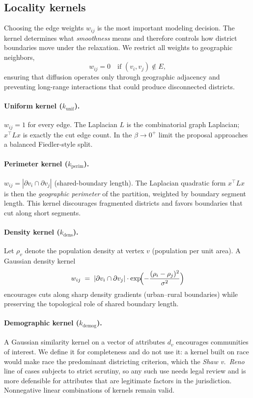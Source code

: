 \documentclass[11pt]{article}
\begin{document}
\subsection{Locality kernels}\label{sec:kernels}

Choosing the edge weights $w_{ij}$ is the most important modeling
decision. The kernel determines what \emph{smoothness} means and
therefore controls how district boundaries move under the relaxation.
We restrict all weights to geographic neighbors,
\begin{equation}\label{eq:kernel-local}
  w_{ij} = 0 \quad \text{if } (v_i, v_j) \notin E,
\end{equation}
ensuring that diffusion operates only through geographic adjacency and
preventing long-range interactions that could produce disconnected
districts.

\paragraph{Uniform kernel ($k_{\mathrm{unif}}$).} $w_{ij} = 1$ for
every edge. The Laplacian $L$ is the combinatorial graph Laplacian;
$x^\top L x$ is exactly the cut edge count. In the $\beta \to 0^+$
limit the proposal approaches a balanced Fiedler-style split.

\paragraph{Perimeter kernel ($k_{\mathrm{perim}}$).} $w_{ij} = |\partial v_i \cap \partial v_j|$
(shared-boundary length). The Laplacian quadratic form $x^\top L x$
is then the \emph{geographic perimeter} of the partition, weighted by
boundary segment length. This kernel discourages fragmented districts
and favors boundaries that cut along short segments.

\paragraph{Density kernel ($k_{\mathrm{dens}}$).} Let $\rho_v$ denote
the population density at vertex $v$ (population per unit area). A
Gaussian density kernel
\[
  w_{ij} \;=\; |\partial v_i \cap \partial v_j| \cdot
  \exp\!\Bigl( -\frac{(\rho_i - \rho_j)^2}{\sigma^2} \Bigr)
\]
encourages cuts along sharp density gradients (urban--rural
boundaries) while preserving the topological role of shared boundary
length.

\paragraph{Demographic kernel ($k_{\mathrm{demog}}$).} A Gaussian
similarity kernel on a vector of attributes $d_v$ encourages
communities of interest. We define it for completeness and do not use
it: a kernel built on race would make race the predominant districting
criterion, which the \emph{Shaw v.\ Reno} line of cases subjects to
strict scrutiny, so any such use needs legal review and is more
defensible for attributes that are legitimate factors in the
jurisdiction. Nonnegative linear combinations of kernels remain
valid.
\end{document}
